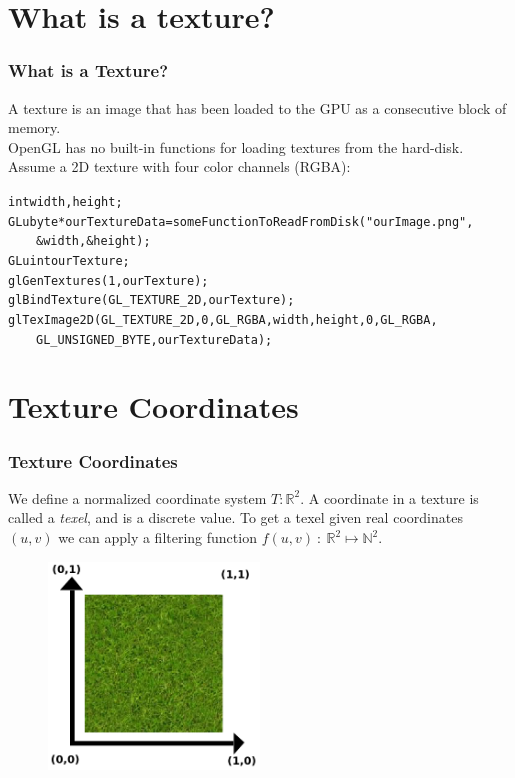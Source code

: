 \documentclass{beamer}
\begin{document}
%
%
%
\section{What is a texture?}
\begin{frame}
\frametitle{What is a Texture?}
A texture is an image that has been loaded to the GPU as a consecutive
block of memory.\\

OpenGL has no built-in functions for loading textures from the hard-disk.\\

Assume a 2D texture with four color channels (RGBA):

\begin{alltt}\footnotesize
int width, height;\\
GLubyte* ourTextureData = someFunctionToReadFromDisk("ourImage.png",\\
\ensuremath{\qquad}\&width, \&height);\\

GLuint ourTexture;\\
glGenTextures(1, ourTexture);\\
glBindTexture(GL\_TEXTURE\_2D, ourTexture);\\
glTexImage2D(GL\_TEXTURE\_2D, 0, GL\_RGBA, width, height, 0, GL\_RGBA,\\
\ensuremath{\qquad}GL\_UNSIGNED\_BYTE, ourTextureData);\\

\end{alltt}
\end{frame}


%
%
%
\section{Texture Coordinates}

\begin{frame}
\frametitle{Texture Coordinates}
We define a normalized coordinate system $T : \mathbb{R}^2$.
A coordinate in a texture is called a \textit{texel}, and is a discrete value.
To get a texel given real coordinates $(u,v)$ we can apply a filtering
function $f(u,v)\ :\ \mathbb{R}^2 \mapsto \mathbb{N}^2$.
\begin{figure}
\includegraphics[width=0.5\textwidth]{images/textureCoordinates.png}
\end{figure}
\end{frame}
\end{document}
